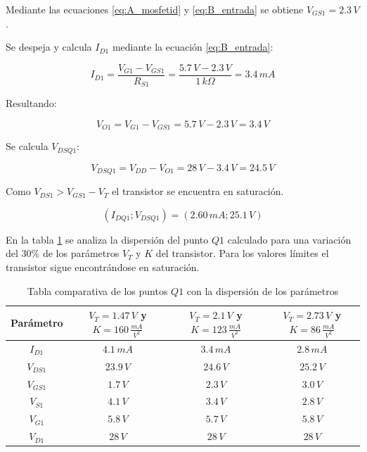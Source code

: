 \documentclass[10pt,spanish,a4paper,notitlepage]{article}
\begin{document}
Mediante las ecuaciones \ref{eq:A_mosfetid} y \ref{eq:B_entrada}
se obtiene $V_{GS1} = 2.3\,\unit{V}$.

Se despeja y calcula $I_{D1}$ mediante la ecuación \ref{eq:B_entrada}:

\[ \displaystyle I_{D1} = \frac{V_{G1} - V_{GS1}}{R_{S1}} = 
\frac{5.7\,\unit{V} - 2.3\,\unit{V}}{1\,\unit{k\Omega}}
= 3.4\,\unit{mA} \]

Resultando:

\[ \displaystyle V_{O1} = V_{G1} - V_{GS1} 
= 5.7\,\unit{V} - 2.3\,\unit{V} 
= 3.4\,\unit{V} \]

Se calcula $V_{DSQ1}$:

\[ \displaystyle V_{DSQ1} = V_{DD} - V_{O1} = 28\,\unit{V} - 3.4\,\unit{V} = 24.5\,\unit{V} \]

Como $V_{DS1} > V_{GS1} - V_T$ el transistor se encuentra en saturación.

\[ \displaystyle (I_{DQ1};V_{DSQ1}) = (2.60\,\unit{mA};25.1\,\unit{V}) \]

En la tabla \ref{table:B_Q1_dispercion} se analiza la dispersión del
punto $Q1$ calculado para una variación del $30\%$ de los parámetros
$V_T$ y $K$ del transistor.
Para los valores límites el transistor sigue encontrándose en saturación.


\begin{table}[H]
\centering
\begin{tabular}{|c|c|c|c|} 
\hline
Parámetro & $V_{T}=1.47\,\unit{V}$ y $K=160\,\unit{\frac{mA}{V^2}}$ & 
$V_{T}=2.1\,\unit{V}$ y $K=123\,\unit{\frac{mA}{V^2}}$ &
$V_{T}=2.73\,\unit{V}$ y $K=86\,\unit{\frac{mA}{V^2}}$  \\ \hline
$I_{D1}$ & $4.1\,\unit{mA}$ & $3.4\,\unit{mA}$ & $2.8\,\unit{mA}$\\ \hline
$V_{DS1}$ & $23.9\,\unit{V}$ & $24.6\,\unit{V}$ & $25.2\,\unit{V}$\\ \hline
$V_{GS1}$ & $1.7\,\unit{V}$  &  $2.3\,\unit{V}$ & $3.0\,\unit{V}$\\ \hline
$V_{S1}$ & $4.1\,\unit{V}$ &  $3.4\,\unit{V}$ & $2.8\,\unit{V}$\\ \hline
$V_{G1}$ & $5.8\,\unit{V}$ &  $5.7\,\unit{V}$ & $5.8\,\unit{V}$\\ \hline
$V_{D1}$ & $28\,\unit{V}$ &  $28\,\unit{V}$ & $28\,\unit{V}$\\ \hline
\end{tabular}
\caption{Tabla comparativa de los puntos $Q1$ con la dispersión de los parámetros}
\label{table:B_Q1_dispercion}
\end{table}
\end{document}
